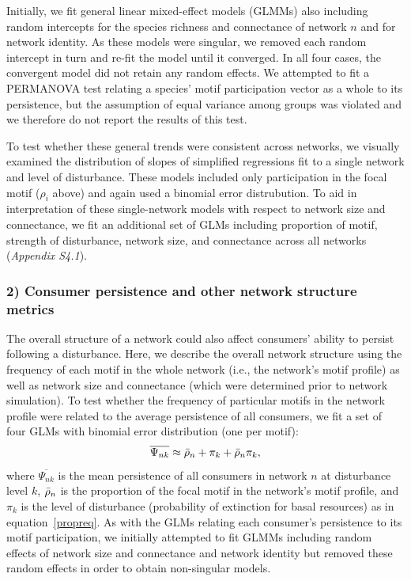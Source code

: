 \documentclass[12pt]{article}
\begin{document}
\begin{spacing}{2.0}
            
            
            Initially, we fit general linear mixed-effect models (GLMMs) also including random  intercepts for the species richness and connectance of network $n$ and for network identity.
            As these models were singular, we removed each random intercept in turn and re-fit the model until it converged.
            In all four cases, the convergent model did not retain any random effects.
            We attempted to fit a PERMANOVA test relating a species' motif participation vector as a whole to its persistence, but the assumption of equal variance among groups was violated and we therefore do not report the results of this test.
            
            
            To test whether these general trends were consistent across networks, we visually examined the distribution of slopes of simplified regressions fit to a single network and level of disturbance.
            These models included only participation in the focal motif ($\rho_{i}$ above) and again used a binomial error distrubution.
            To aid in interpretation of these single-network models with respect to network size and connectance, we fit an additional set of GLMs including proportion of motif, strength of disturbance, network size, and connectance across all networks (\emph{Appendix S4.1}).



        \subsubsection*{2) Consumer persistence and other network structure metrics}

            The overall structure of a network could also affect consumers' ability to persist following a disturbance.
            Here, we describe the overall network structure using the frequency of each motif in the whole network (i.e., the network's motif profile) as well as network size and connectance (which were determined prior to network simulation).
            To test whether the frequency of particular motifs in the network profile were related to the average persistence of all consumers, we fit a set of four GLMs with binomial error distribution (one per motif):
                \begin{equation}
                    \overline{\Psi_{nk}} \approx \Bar{\rho}_{n} + \pi_{k} + \Bar{\rho}_{n}\pi_{k},
                    \label{netpropeq}
                \end{equation}
            \noindent where $\overline{\Psi_{nk}}$ is the mean persistence of all consumers in network $n$ at disturbance level $k$, $\Bar{\rho}_{n}$ is the proportion of the focal motif in the network's motif profile, and $\pi_k$ is the level of disturbance (probability of extinction for basal resources) as in equation~\ref{propreq}.
            As with the GLMs relating each consumer's persistence to its motif participation, we initially attempted to fit GLMMs including random effects of network size and connectance and network identity but removed these random effects in order to obtain non-singular models.



\end{spacing}
\end{document}
